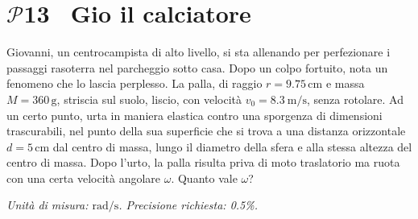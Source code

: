 \documentclass[a4paper,12pt]{article}
\newcommand{\problemtitle}[1]{
  \noindent
  \textbf{\Large #1}\hspace{0.5em}
  \raisebox{0.6ex}{\rule{\linewidth - \widthof{\textbf{\Large #1}} - 0.6em}{0.4pt}}%
}
\begin{document}
\section*{\problemtitle{$\mathcal{P}${\small{13}} \, Gio il calciatore}}
\begin{minipage}[c]{0.68\textwidth}
Giovanni, un centrocampista di alto livello, si sta allenando per perfezionare i passaggi rasoterra nel parcheggio sotto casa. Dopo un colpo fortuito, nota un fenomeno che lo lascia perplesso.
La palla, di raggio $r = 9{.}75\,\text{cm}$ e massa $M = 360\,\text{g}$, striscia sul suolo, liscio, con velocità $v_0 = \SI{8.3}{\meter\per\second}$, senza rotolare. Ad un certo punto, urta in maniera elastica contro una sporgenza di dimensioni trascurabili, nel punto della sua superficie che si trova a una distanza orizzontale $d = 5\,\text{cm}$ dal centro di massa, lungo il diametro della sfera e alla stessa altezza del centro di massa. Dopo l'urto, la palla risulta priva di moto traslatorio ma ruota con una certa velocità angolare $\omega$. Quanto vale $\omega$?\\
\end{minipage}
\begin{minipage}[c]{0.35\textwidth}
\begin{center}
\end{center}
\end{minipage}

\textit{Unità di misura: $\si{\radian\per\second}$. Precisione richiesta: 0.5\%.}
\end{document}
